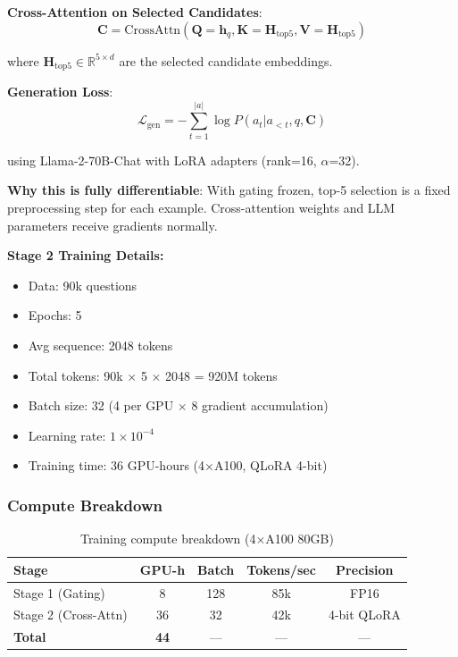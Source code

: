 \documentclass[10pt,twocolumn]{article}
\begin{document}
\textbf{Cross-Attention on Selected Candidates}:
\begin{equation}
\mathbf{C} = \text{CrossAttn}(\mathbf{Q}=\mathbf{h}_q, \mathbf{K}=\mathbf{H}_{\text{top5}}, \mathbf{V}=\mathbf{H}_{\text{top5}})
\end{equation}

where $\mathbf{H}_{\text{top5}} \in \mathbb{R}^{5 \times d}$ are the selected candidate embeddings.

\textbf{Generation Loss}:
\begin{equation}
\mathcal{L}_{\text{gen}} = -\sum_{t=1}^{|a|} \log P(a_t | a_{<t}, q, \mathbf{C})
\label{eq:gen_loss}
\end{equation}

using Llama-2-70B-Chat with LoRA adapters \cite{hu2022lora} (rank=16, $\alpha$=32).

\textbf{Why this is fully differentiable}: With gating frozen, top-5 selection is a fixed preprocessing step for each example. Cross-attention weights and LLM parameters receive gradients normally.

\textbf{Stage 2 Training Details:}
\begin{itemize}
    \item Data: 90k questions
    \item Epochs: 5
    \item Avg sequence: 2048 tokens
    \item Total tokens: 90k $\times$ 5 $\times$ 2048 = 920M tokens
    \item Batch size: 32 (4 per GPU $\times$ 8 gradient accumulation)
    \item Learning rate: $1 \times 10^{-4}$
    \item Training time: 36 GPU-hours (4$\times$A100, QLoRA 4-bit)
\end{itemize}


\subsubsection{Compute Breakdown}
\label{sec:compute}

\begin{table}[h]
\centering
\caption{Training compute breakdown (4$\times$A100 80GB)}
\label{tab:compute}
\small
\begin{tabular}{@{}lcccc@{}}
\toprule
\textbf{Stage} & \textbf{GPU-h} & \textbf{Batch} & \textbf{Tokens/sec} & \textbf{Precision} \\
\midrule
Stage 1 (Gating) & 8 & 128 & 85k & FP16 \\
Stage 2 (Cross-Attn) & 36 & 32 & 42k & 4-bit QLoRA \\
\midrule
\textbf{Total} & \textbf{44} & --- & --- & --- \\
\bottomrule
\end{tabular}
\end{table}
\end{document}
